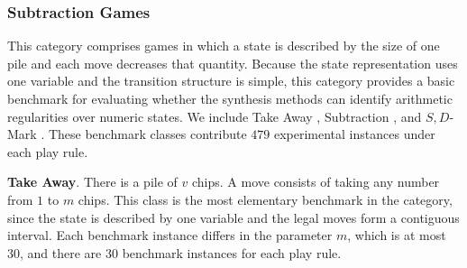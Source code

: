 \documentclass[review]{elsarticle}
\newcommand{\set}[1]{\{ #1 \}}
\newcommand{\tuple}[1]{\langle {#1} \rangle}
\newcommand{\true}{\top}
\newcommand{\statevar}{\mathcal{X}}
\newcommand{\act}{\mathcal{A}}
\newcommand{\constraint}{\mathcal{C}}
\newcommand{\estate}{\mathcal{E}}
\newcommand{\pre}{\mathtt{pre}}
\newcommand{\eff}{\mathtt{eff}}
\begin{document}
\subsubsection{Subtraction Games}
This category comprises games in which a state is described by the size of one pile and each move decreases that quantity.
Because the state representation uses one variable and the transition structure is simple, this category provides a basic benchmark for evaluating whether the synthesis methods can identify arithmetic regularities over numeric states.
We include Take Away \cite{Gol1966}, Subtraction \cite{Yag2001}, and $S,D$-Mark \cite{Sop2016}.
These benchmark classes contribute $479$ experimental instances under each play rule.

\textbf{Take Away}. There is a pile of $v$ chips.
A move consists of taking any number from $1$ to $m$ chips.
This class is the most elementary benchmark in the category, since the state is described by one variable and the legal moves form a contiguous interval.
Each benchmark instance differs in the parameter $m$, which is at most $30$, and there are $30$ benchmark instances for each play rule.
\end{document}
